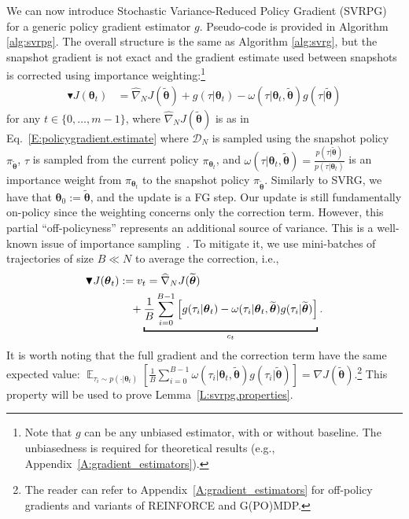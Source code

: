 \documentclass{article}
\makeatletter
\theoremstyle{remark}
\theoremstyle{definition}
\DeclareRobustCommand{\eg}{e.g.,\@\xspace}
\DeclareRobustCommand{\ie}{i.e.,\@\xspace}
\DeclareMathOperator*{\EV}{\mathbb{E}}
\newcommand{\EVV}[2][\ppvect \in \ppspace]{\EV_{#1}\left[{#2}\right]}
\newcommand{\vtheta}{\boldsymbol{\theta}}
\newcommand{\wt}[1]{\widetilde{#1}}
\newcommand{\wh}[1]{\widehat{#1}}
\makeatother
\begin{document}
We can now introduce Stochastic Variance-Reduced Policy Gradient (SVRPG) for a generic policy gradient estimator $g$. Pseudo-code is provided in Algorithm \ref{alg:svrpg}.
The overall structure is the same as Algorithm \ref{alg:svrg}, 
but the snapshot gradient is not exact and the gradient estimate used between snapshots is corrected using importance weighting:\footnote{Note that $g$ can be any unbiased estimator, with or without baseline. The unbiasedness is required for theoretical results (\eg Appendix~\ref{A:gradient_estimators}).}
\begin{align*}
        \blacktriangledown J(\vtheta_{t}) &= \wh{\nabla}_N J(\wt{\vtheta}) + g(\tau|\vtheta_t) - \omega(\tau|\vtheta_t, \wt{\vtheta}) g(\tau|\wt{\vtheta})
\end{align*}
for any $t \in \{0,\ldots,m-1\}$,
where $\wh{\nabla}_N J(\wt{\vtheta})$ is as in Eq.~\eqref{E:policygradient.estimate} where $\mathcal{D}_N$ is sampled using the snapshot policy $\pi_{\wt{\vtheta}}$, $\tau$ is sampled from the current policy $\pi_{\vtheta_t}$, and $\omega(\tau|\vtheta_t, \wt{\vtheta}) = \frac{p(\tau|\wt{\vtheta})}{p(\tau|\vtheta_t)}$ is an importance weight from $\pi_{\vtheta_t}$ to the snapshot policy $\pi_{\wt{\vtheta}}$. 
Similarly to SVRG, we have that $\vtheta_0 := \wt{\vtheta}$, and the update is a FG step.
Our update is still fundamentally on-policy since the weighting concerns only the correction term. However, this partial ``off-policyness'' represents an additional source of variance. This is a well-known issue of importance sampling~\citep[\eg][]{thomas2015high}. To mitigate it, we use mini-batches of trajectories of size $B \ll N$ to average the correction, \ie
\begin{align}\label{E:svrpg.estimate.batch}
        \blacktriangledown J(\vtheta_{t}) &:= v_t= \wh{\nabla}_N J(\wt{\vtheta})\\ \notag
                                            & \quad{} + 
        \underbracket{
        \frac{1}{B} \sum_{i=0}^{B-1} \left[
        g(\tau_i|\vtheta_t) - \omega(\tau_i|\vtheta_t, \wt{\vtheta}) g(\tau_i|\wt{\vtheta})
\right]}_{c_t}.
\end{align}
It is worth noting that the full gradient and the correction term have the same expected value: $\EVV[\tau_i \sim p(\cdot|\vtheta_t)]{\frac{1}{B} \sum_{i=0}^{B-1} \omega(\tau_i|\vtheta_t, \wt{\vtheta}) g(\tau_i|\wt{\vtheta})} = \nabla J(\wt{\vtheta})$.\footnote{The reader can refer to Appendix~\ref{A:gradient_estimators} for off-policy gradients and variants of REINFORCE and G(PO)MDP.}
This property will be used to prove Lemma~\ref{L:svrpg.properties}.
\end{document}
